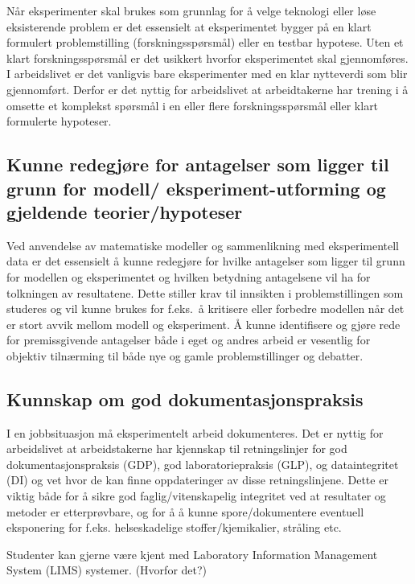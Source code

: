\documentclass{article}
\begin{document}
Når eksperimenter skal brukes som grunnlag for å velge teknologi eller løse eksisterende problem er det essensielt at eksperimentet bygger på en klart formulert problemstilling (forskningsspørsmål) eller en testbar hypotese. Uten et klart forskningsspørsmål er det usikkert hvorfor eksperimentet skal gjennomføres. I arbeidslivet er det vanligvis bare eksperimenter med en klar nytteverdi som blir gjennomført. Derfor er det nyttig for arbeidslivet at arbeidtakerne har trening i å omsette et komplekst spørsmål i en eller flere forskningsspørsmål eller klart formulerte hypoteser.

\subsection{Kunne redegjøre for antagelser som ligger til grunn for modell/ eksperiment-utforming og gjeldende teorier/hypoteser}
Ved anvendelse av matematiske modeller og sammenlikning med eksperimentell data er det essensielt å kunne redegjøre for hvilke antagelser som ligger til grunn for modellen og eksperimentet og hvilken betydning antagelsene vil ha for tolkningen av resultatene.
Dette stiller krav til innsikten i problemstillingen som studeres og vil kunne brukes for f.eks.~å kritisere eller forbedre modellen når det er stort avvik mellom modell og eksperiment.
Å kunne identifisere og gjøre rede for premissgivende antagelser både i eget og andres arbeid er vesentlig for objektiv tilnærming til både nye og gamle problemstillinger og debatter.

\subsection{Kunnskap om god dokumentasjonspraksis}
I en jobbsituasjon må eksperimentelt arbeid dokumenteres. Det er nyttig for arbeidslivet at arbeidstakerne har kjennskap til retningslinjer for god dokumentasjonspraksis (GDP), god laboratoriepraksis (GLP), og dataintegritet (DI) og vet hvor de kan finne oppdateringer av disse retningslinjene.
Dette er viktig både for å sikre god faglig/vitenskapelig integritet ved at resultater og metoder er etterprøvbare, og for å å kunne spore/dokumentere eventuell eksponering for f.eks. helseskadelige stoffer/kjemikalier, stråling etc.

Studenter kan gjerne være kjent med Laboratory Information Management System (LIMS) systemer. {\color{red}(Hvorfor det?)}
\end{document}
